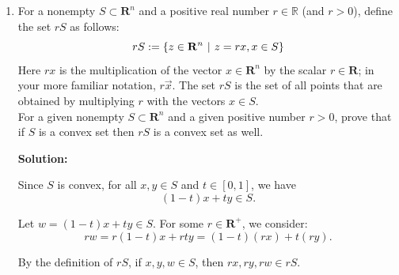 \documentclass[11pt]{article}
\newenvironment{solution}
  {\par\noindent\textbf{Solution:}\par}
  {\par}
\begin{document}
\begin{enumerate}
\begin{enumerate}[label=(\alph*)]
\begin{solution}
    \end{solution}
    \item Solve the LP by writing down a code in the Python language using the Jupyter
notebook; login to UBC syzygy website and the Jupyter notebook. Attach the pdf file that include both the code and the results; note that you can
save the Jupyter notebook as a pdf file. \\  Hint1: You will need integer variables, those taking only integer values. For that
you can add the command cat='Integer' like in the following example: \\ 
ticketvars = LpVariable.dicts("ticket", ticket, lowBound=0, cat='Integer') \\ 
Here the last part cat='Integer' restrict the variables to be integer variables. ] \\  Hint2: It is not necessary, but, to practice with 'for-loops' and 'dictionary', you
can try to use dictionary variables as done in the blending (cat food) example. ]
  \begin{solution}
    

  \end{solution}
  \end{enumerate}
  \item For a nonempty $S \subset \mathbf{R}^n$ and a positive real number $r \in \mathbb{R}$ (and $r > 0$),
    define the set $rS$ as follows:
    $$rS := \left\{ z \in \mathbf{R}^n \hspace{.05in} \vert \hspace{.05in} z = rx, x \in S \right\}$$
    Here $rx$ is the multiplication of the vector $x \in \mathbf{R}^n$ by the scalar $r \in \mathbf{R}$; in your more
    familiar notation, $r\vec{x}$. The set $rS$ is the set of all points that are obtained by multiplying
    $r$ with the vectors $x \in S$. \\ 
    For a given nonempty $S \subset \mathbf{R}^n$ and a given positive number $r>0$, prove that if $S$ is
    a convex set then $rS$ is a convex set as well.
    \begin{solution}
      Since $S$ is convex, for all $x, y \in S$ and $t \in [0,1]$, we have 
      $$(1-t)x + ty \in S.$$
      
      Let $w = (1-t)x + ty \in S$. For some $r \in \mathbf{R}^+$, we consider:
      $$rw = r(1-t)x + rty = (1-t)(rx) + t(ry).$$

      By the definition of $rS$, if $x, y, w \in S$, then $rx, ry, rw \in rS$. 


\end{solution}
\end{enumerate}
\end{document}
